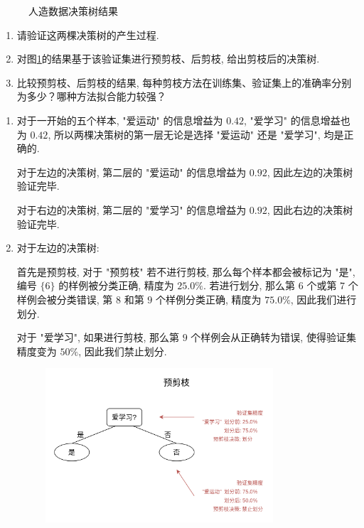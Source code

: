 \documentclass[answers]{exam}  %
\begin{document}
\begin{questions}
\begin{figure}[ht]
    \caption{人造数据决策树结果}\label{ch4_fig:decision_tree_1}
  \end{figure}
  \begin{enumerate}
    \item
          请验证这两棵决策树的产生过程.
    \item
          对图\ref{ch4_fig:decision_tree_1}的结果基于该验证集进行预剪枝、后剪枝, 给出剪枝后的决策树.
    \item
          比较预剪枝、后剪枝的结果, 每种剪枝方法在训练集、验证集上的准确率分别为多少？哪种方法拟合能力较强？
  \end{enumerate}

  \begin{solution}
    \begin{enumerate}
      \item

            对于一开始的五个样本, "爱运动" 的信息增益为 $0.42$, "爱学习" 的信息增益也为 $0.42$, 所以两棵决策树的第一层无论是选择 "爱运动" 还是 "爱学习", 均是正确的.

            对于左边的决策树, 第二层的 "爱运动" 的信息增益为 $0.92$, 因此左边的决策树验证完毕.

            对于右边的决策树, 第二层的 "爱学习" 的信息增益为 $0.92$, 因此右边的决策树验证完毕.

      \item

            对于左边的决策树:

            首先是预剪枝, 对于 "预剪枝" 若不进行剪枝, 那么每个样本都会被标记为 "是", 编号 $\{ 6 \}$ 的样例被分类正确, 精度为 $25.0\%$. 若进行划分, 那么第 $6$ 个或第 $7$ 个样例会被分类错误, 第 $8$ 和第 $9$ 个样例分类正确, 精度为 $75.0\%$, 因此我们进行划分.

            对于 "爱学习", 如果进行剪枝, 那么第 $9$ 个样例会从正确转为错误, 使得验证集精度变为 $50\%$, 因此我们禁止划分.

            \begin{figure}[H]
              \centering
              \includegraphics[width=0.8\textwidth]{./figure/PS3-3-2-1.png}
              \label{Fig.main1}
            \end{figure}


\end{enumerate}
\end{solution}
\end{questions}
\end{document}
